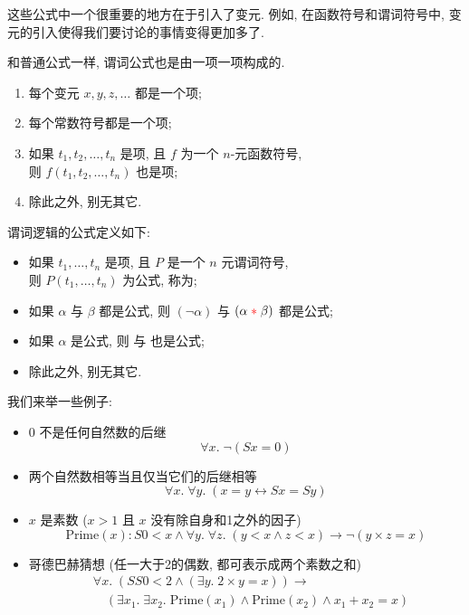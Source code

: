 这些公式中一个很重要的地方在于引入了变元. 例如, 在函数符号和谓词符号中, 变元的引入使得我们要讨论的事情变得更加多了. 

和普通公式一样, 谓词公式也是由一项一项构成的.

\begin{definition}[项 (Term)]
  \begin{enumerate}
    \item 每个变元 $x, y, z, \dots$ 都是一个项;
    \item 每个常数符号都是一个项;
    \item 如果 $t_{1}, t_{2}, \dots, t_{n}$ 是项,
      且 $f$ 为一个 $n$-元函数符号, \\
      则 $f(t_{1}, t_{2}, \dots, t_{n})$ 也是项;
    \item 除此之外, 别无其它. 
  \end{enumerate}
\end{definition}

\begin{definition}[公式 (Formula)] 谓词逻辑的公式定义如下: 
  \begin{itemize}
    \item 如果 $t_{1}, \dots, t_{n}$ 是项, 且 $P$ 是一个 $n$ 元谓词符号, \\
      则 $P(t_{1}, \dots, t_{n})$ 为公式, 称为;
    \item 如果 $\alpha$ 与 $\beta$ 都是公式, 则 $(\lnot \alpha)$
      与 $(\alpha \;\textcolor{red}{\ast}\; \beta)$ 都是公式;
    \item 如果 $\alpha$ 是公式, 则 
      与  也是公式;
    \item 除此之外, 别无其它. 
  \end{itemize}
\end{definition}

我们来举一些例子: 

\begin{example}
	\begin{itemize}
    \item 0 不是任何自然数的后继
        \[
          \forall x.\; \lnot (Sx = 0)
        \]
      \item 两个自然数相等当且仅当它们的后继相等
        \[
          \forall x.\; \forall y.\; (x = y \leftrightarrow Sx = Sy)
        \]
      \item $x$ 是素数 ($x > 1$ 且 $x$ 没有除自身和1之外的因子)
        \[
          \text{Prime}(x): S0 < x \land \forall y.\; \forall z.\; (y < x \land z < x) \to \lnot (y \times z = x)
        \]
      \item 哥德巴赫猜想 (任一大于2的偶数, 都可表示成两个素数之和)
        \begin{align*}
          &\forall x.\; (SS0 < 2 \land (\exists y.\; 2 \times y = x)) \to \\
            &\quad (\exists x_{1}.\; \exists x_{2}.\; \text{Prime}(x_{1}) \land \text{Prime}(x_{2})
              \land x_{1} + x_{2} = x)
        \end{align*}
  \end{itemize}

\end{example}



